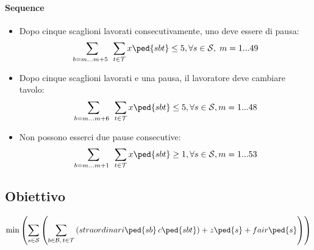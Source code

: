 \paragraph{Sequence} 
\begin{itemize} 
     \item Dopo cinque scaglioni lavorati consecutivamente, uno deve essere di pausa:
    \[\sum_{b = m...m+5 \; \;} \sum_{t \in \mathcal{T}} x\ped{sbt} \le 5, \forall s \in \mathcal{S}, \; m=1...49 \]
    \item Dopo cinque scaglioni lavorati e una pausa, il lavoratore deve cambiare tavolo:
    \[\sum_{b = m...m+6 \; \;} \sum_{t \in \mathcal{T}} x\ped{sbt} \le 5, \forall s \in \mathcal{S}, m=1...48 \]
    \item Non possono esserci due pause consecutive:
    \[\sum_{b = m...m+1 \; \;} \sum_{t\in \mathcal{T}} x\ped{sbt} \ge 1, \forall s\in \mathcal{S}, m=1...53 \]
\end{itemize}
\subsection{Obiettivo}
\[ \min \left(\sum_{s \in \mathcal{S}}\left(\sum_{b \in \mathcal{B}, \,t \in \mathcal{T}}\left(straordinari\ped{sb} \, c\ped{sbt}\right) + z\ped{s}+fair\ped{s}\right) \right)\]

